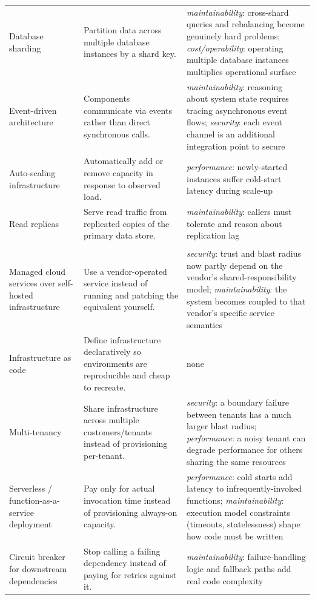 \documentclass[preprint,12pt,authoryear]{elsarticle}
\renewcommand{\_}{\textunderscore\allowbreak{}}
\begin{document}
{\begin{longtable}{@{}>{\raggedright\arraybackslash}p{1.35in}>{\raggedright\arraybackslash}p{1.65in}>{\raggedright\arraybackslash}p{2.35in}@{}}
Database sharding & Partition data across multiple database instances by a shard key. & \emph{maintainability}: cross-shard queries and rebalancing become genuinely hard problems; \emph{cost/operability}: operating multiple database instances multiplies operational surface \\
Event-driven architecture & Components communicate via events rather than direct synchronous calls. & \emph{maintainability}: reasoning about system state requires tracing asynchronous event flows; \emph{security}: each event channel is an additional integration point to secure \\
Auto-scaling infrastructure & Automatically add or remove capacity in response to observed load. & \emph{performance}: newly-started instances suffer cold-start latency during scale-up \\
Read replicas & Serve read traffic from replicated copies of the primary data store. & \emph{maintainability}: callers must tolerate and reason about replication lag \\
\midrule
\multicolumn{3}{@{}l}{\textbf{Cost/operability}} \\
\midrule
Managed cloud services over self-hosted infrastructure & Use a vendor-operated service instead of running and patching the equivalent yourself. & \emph{security}: trust and blast radius now partly depend on the vendor's shared-responsibility model; \emph{maintainability}: the system becomes coupled to that vendor's specific service semantics \\
Infrastructure as code & Define infrastructure declaratively so environments are reproducible and cheap to recreate. & none \\
Multi-tenancy & Share infrastructure across multiple customers/tenants instead of provisioning per-tenant. & \emph{security}: a boundary failure between tenants has a much larger blast radius; \emph{performance}: a noisy tenant can degrade performance for others sharing the same resources \\
Serverless / function-as-a-service deployment & Pay only for actual invocation time instead of provisioning always-on capacity. & \emph{performance}: cold starts add latency to infrequently-invoked functions; \emph{maintainability}: execution model constraints (timeouts, statelessness) shape how code must be written \\
Circuit breaker for downstream dependencies & Stop calling a failing dependency instead of paying for retries against it. & \emph{maintainability}: failure-handling logic and fallback paths add real code complexity \\
\end{longtable}
}
\end{document}
